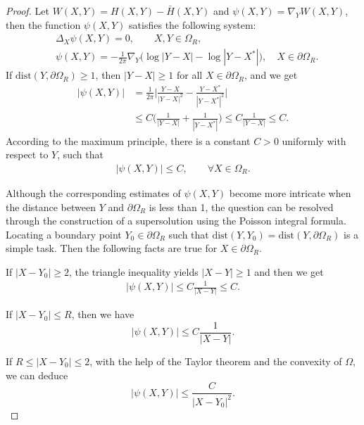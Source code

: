 \documentclass[11pt,reqno]{amsart}%
\theoremstyle{definition}
\theoremstyle{remark}
\begin{document}
\begin{proof}
Let $W(X,Y)=H(X,Y)-\bar{H}(X,Y)$ and $\psi(X,Y)=\nabla_{Y}W(X,Y)$, then the function $\psi(X,Y)$ satisfies the following system:
\begin{align}
&\Delta_{X}\psi(X,Y)=0, \qquad X,Y\in\Omega_{R},\nonumber\\
&\psi(X,Y)=-\frac{1}{2\pi}\nabla_{Y}\big(\log|Y-X|-\log|Y-X^{*}|\big),\quad X\in\partial\Omega_{R}.\nonumber
\end{align}
%
If $\text{dist}(Y,\partial\Omega_{R})\geq 1$, then $|Y-X|\geq 1$ for all $X\in\partial\Omega_{R}$,  and we get
\begin{align}
|\psi(X,Y)|&=\frac{1}{2\pi}\big|\frac{Y-X}{|Y-X|^{2}}-\frac{Y-X^{*}}{|Y-X^{*}|^{2}}\big|\nonumber\\
&\leq C \big(\frac{1}{|Y-X|}+\frac{1}{|Y-X^{*}|}\big)\leq C\frac{1}{|Y-X|}\leq C.\nonumber
\end{align}
 According to the maximum principle, there is a constant $C>0$ uniformly with respect to $Y$, such that
 \begin{align}
|\psi(X,Y)|\leq C, \qquad  \forall X\in \Omega_{R}.\nonumber
\end{align}

Although the corresponding estimates  of $\psi(X,Y)$  become more intricate when the distance between $Y$ and $\partial\Omega_{R}$ is less than 1, the question can be resolved through the construction of a supersolution using the Poisson integral formula.
 Locating a boundary point $Y_{0}\in\partial\Omega_{R}$ such that $\text{dist}(Y,Y_{0})=\text{dist}(Y,\partial\Omega_{R})$ is a simple task. Then the following facts are true for $X\in \partial\Omega_{R}$.

If $|X-Y_{0}|\geq 2$, the triangle inequality  yields $|X-Y|\geq 1$ and then we get
\begin{align}
|\psi(X,Y)|\leq C\frac{1}{|X-Y|}\leq C. \nonumber
\end{align}

If $|X-Y_{0}|\leq R$, then we have
$$|\psi(X,Y)|\leq C\frac{1}{|X-Y|}.$$

If $R\leq|X-Y_{0}|\leq 2$, with the help of the Taylor theorem and the convexity of $\Omega$, we can deduce
$$|\psi(X,Y)|\leq \frac{C}{|X-Y_{0}|^{2}}.$$


\end{proof}
\end{document}
